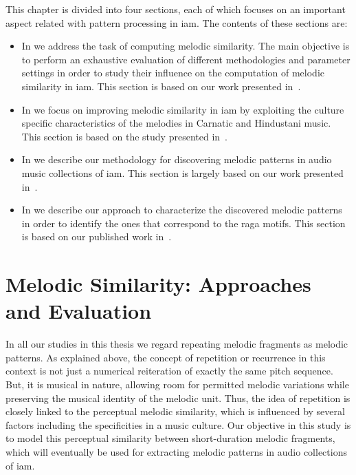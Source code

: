 This chapter is divided into four sections, each of which focuses on an important aspect related with pattern processing in \gls{iam}. The contents of these sections are:
\begin{itemize}
	\item In  we address the task of computing melodic similarity. The main objective is to perform an exhaustive evaluation of different methodologies and parameter settings in order to study their influence on the computation of melodic similarity  in \gls{iam}. This section is based on our work presented in~\cite{gulati_ICASSP2015}.
	\item In  we focus on improving melodic similarity in \gls{iam} by exploiting the culture specific characteristics of the melodies in Carnatic and Hindustani music. This section is based on the study presented in~\cite{gulati_ISMIR_2015}.
	\item In  we describe our methodology for discovering melodic patterns in audio music collections of \gls{iam}. This section is largely based on our work presented in~\cite{gulati_SITIS_2014}.
	\item In  we describe our approach to characterize the discovered melodic patterns in order to identify the ones that correspond to the \gls{raga} motifs. This section is based on our published work in~\cite{gulati_communities_2016}.
\end{itemize}




\section{Melodic Similarity: Approaches and Evaluation}
\label{sec:patterns_evaluation_of_similarity_measures}

In all our studies in this thesis we regard repeating melodic fragments as melodic patterns. As explained above, the concept of repetition or recurrence in this context is not just a numerical reiteration of exactly the same pitch sequence. But, it is musical in nature, allowing room for permitted melodic variations while preserving the musical identity of the melodic unit. Thus, the idea of repetition is closely linked to the perceptual melodic similarity, which is influenced by several factors including the specificities in a music culture. Our objective in this study is to model this perceptual similarity between short-duration melodic fragments, which will eventually be used for extracting melodic patterns in audio collections of \gls{iam}.

